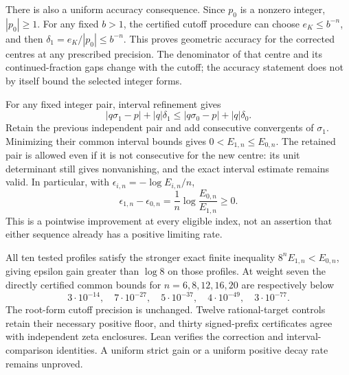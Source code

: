\documentclass[11pt]{article}
\theoremstyle{remark}
\begin{document}
There is also a uniform accuracy consequence. Since \(p_0\) is a
nonzero integer, \(|p_0|\ge1\). For any fixed \(b>1\), the certified
cutoff procedure can choose \(e_K\le b^{-n}\), and then
\(\delta_1=e_K/|p_0|\le b^{-n}\). This proves geometric accuracy
for the corrected centres at any prescribed precision. The denominator
of that centre and its continued-fraction gaps change with the cutoff;
the accuracy statement does not by itself bound the selected integer
forms.

For any fixed integer pair, interval refinement gives
\[
 |q\sigma_1-p|+|q|\delta_1
 \le |q\sigma_0-p|+|q|\delta_0.
\]
Retain the previous independent pair and add consecutive convergents
of \(\sigma_1\). Minimizing their common interval bounds gives
\(0<E_{1,n}\le E_{0,n}\). The retained pair is allowed even if
it is not consecutive for the new centre: its unit determinant still
gives nonvanishing, and the exact interval estimate remains valid.
In particular, with \(\epsilon_{i,n}=-\log E_{i,n}/n\),
\[
 \epsilon_{1,n}-\epsilon_{0,n}
   =\frac1n\log\frac{E_{0,n}}{E_{1,n}}\ge0.
\]
This is a pointwise improvement at every eligible index, not an
assertion that either sequence already has a positive limiting rate.

All ten tested profiles satisfy the stronger exact finite inequality
\(8^nE_{1,n}<E_{0,n}\), giving epsilon gain greater than \(\log8\)
on those profiles. At weight seven the directly certified common
bounds for \(n=6,8,12,16,20\) are respectively below
\[
 3\cdot10^{-14},\quad7\cdot10^{-27},\quad5\cdot10^{-37},
 \quad4\cdot10^{-49},\quad3\cdot10^{-77}.
\]
The root-form cutoff precision is unchanged. Twelve rational-target
controls retain their necessary positive floor, and thirty signed-prefix
certificates agree with independent zeta enclosures. Lean verifies
the correction and interval-comparison identities. A uniform strict
gain or a uniform positive decay rate remains unproved.
\end{document}
